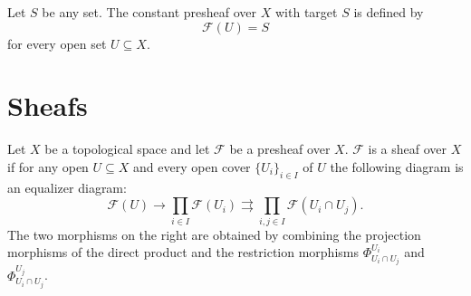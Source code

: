     \begin{example}\label{sheaf:constant_presheaf}
        Let $S$ be any set. The constant presheaf over $X$ with target $S$ is defined by \[\mathcal{F}(U) = S\] for every open set $U\subseteq X$.
    \end{example}

\section{Sheafs}

    \begin{property}
        Let $X$ be a topological space and let $\mathcal{F}$ be a presheaf over $X$. $\mathcal{F}$ is a sheaf over $X$ if for any open $U\subseteq X$ and every open cover $\{U_i\}_{i\in I}$ of $U$ the following diagram is an equalizer diagram:
        \begin{equation}
            \mathcal{F}(U)\rightarrow\prod_{i\in I}\mathcal{F}(U_i)\rightrightarrows\prod_{i, j\in I}\mathcal{F}(U_i\cap U_j).
        \end{equation}
        The two morphisms on the right are obtained by combining the projection morphisms of the direct product and the restriction morphisms $\Phi^{U_i}_{U_i\cap U_j}$ and $\Phi^{U_j}_{U_i\cap U_j}$.
    \end{property}

